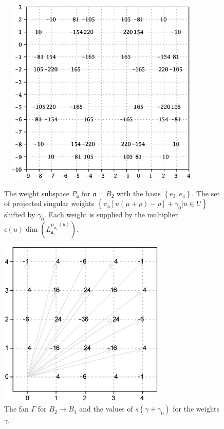 \documentclass[12pt]{iopart}
\theoremstyle{definition}
\newcommand{\af}{\mathfrak{a}}
\begin{document}
\begin{figure}[pt]
  \centering
    \includegraphics[width=100mm,height=90mm]{figure4.eps}
  \caption{The weight subspace $P_{\af}$ for $\af=B_2$ with the basis $\left\{e_3,e_4\right\}$.
  The set of projected singular weights $\left\{\pi _{\af}\left[ u(\mu +\rho )-\rho \right] +\gamma_0 | u \in U \right\}$
  shifted by $\gamma_0$. Each weight is supplied by the multiplier
  $\epsilon(u)\dim\left(L_{\af_{\perp }}^{\mu_{\af_{\perp }}\left( u\right) }\right)$.}
  \label{fig:B4B2anom}

%
  \centering
  \includegraphics[height=80mm]{figure5.eps}
  \caption{The fan $\Gamma$ for $B_2\rightarrow B_4$ and the values of $s(\gamma+\gamma_0)$ for the weights $\gamma$.}
  \label{fig:B4B2Fan}
\end{figure}
\end{document}
